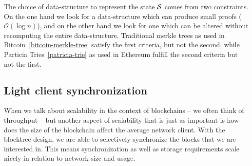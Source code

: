 The choice of data-structure to represent the state $\mathcal{S}$ comes from two
constraints.  On the one hand we look for a data-structure which can produce
small proofs ($\mathcal{O}(\log n)$), and on the other hand we look for one
which can be altered without recomputing the entire data-structure. Traditional
merkle trees as used in Bitcoin~\ref{bitcoin-merkle-tree} satisfy the first
criteria, but not the second, while Particia Tries~\ref{patricia-trie} as used
in Ethereum fulfill the second criteria but not the first.

\subsection{Light client synchronization}

When we talk about scalability in the context of blockchains -- we often think
of throughput -- but another aspect of scalability that is just as important is
how does the size of the blockchain affect the average network client. With the
blocktree design, we are able to selectively synchronize the blocks that we are
interested in. This means synchronization as well as storage requirements scale
nicely in relation to network size and usage.
